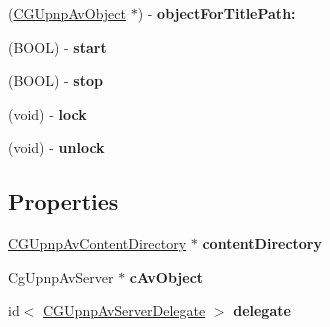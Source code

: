 \begin{DoxyCompactItemize}
\item 
\hypertarget{interface_c_g_upnp_av_server_a2242e54ebbd1783da67b6a1f39f46377}{(\hyperlink{interface_c_g_upnp_av_object}{C\-G\-Upnp\-Av\-Object} $\ast$) -\/ {\bfseries object\-For\-Title\-Path\-:}}\label{interface_c_g_upnp_av_server_a2242e54ebbd1783da67b6a1f39f46377}

\item 
\hypertarget{interface_c_g_upnp_av_server_ad04c7434fc75b76c40f943d7a03c3927}{(B\-O\-O\-L) -\/ {\bfseries start}}\label{interface_c_g_upnp_av_server_ad04c7434fc75b76c40f943d7a03c3927}

\item 
\hypertarget{interface_c_g_upnp_av_server_a5aea637778ecfec92a16c435e430e401}{(B\-O\-O\-L) -\/ {\bfseries stop}}\label{interface_c_g_upnp_av_server_a5aea637778ecfec92a16c435e430e401}

\item 
\hypertarget{interface_c_g_upnp_av_server_a7d462910c3d72f7cba44d2d8e1ba8409}{(void) -\/ {\bfseries lock}}\label{interface_c_g_upnp_av_server_a7d462910c3d72f7cba44d2d8e1ba8409}

\item 
\hypertarget{interface_c_g_upnp_av_server_a1982ae8c35c3a87525807f97f32f5c62}{(void) -\/ {\bfseries unlock}}\label{interface_c_g_upnp_av_server_a1982ae8c35c3a87525807f97f32f5c62}

\end{DoxyCompactItemize}
\subsection*{Properties}
\begin{DoxyCompactItemize}
\item 
\hypertarget{interface_c_g_upnp_av_server_aebfa94b783737e8c4f9ecfd539d1c68c}{\hyperlink{interface_c_g_upnp_av_content_directory}{C\-G\-Upnp\-Av\-Content\-Directory} $\ast$ {\bfseries content\-Directory}}\label{interface_c_g_upnp_av_server_aebfa94b783737e8c4f9ecfd539d1c68c}

\item 
\hypertarget{interface_c_g_upnp_av_server_aeef3434dabe516868ada6fb63d63d129}{Cg\-Upnp\-Av\-Server $\ast$ {\bfseries c\-Av\-Object}}\label{interface_c_g_upnp_av_server_aeef3434dabe516868ada6fb63d63d129}

\item 
\hypertarget{interface_c_g_upnp_av_server_ad52c3c42a21c2cc46c4fd32882c7fe71}{id$<$ \hyperlink{protocol_c_g_upnp_av_server_delegate-p}{C\-G\-Upnp\-Av\-Server\-Delegate} $>$ {\bfseries delegate}}\label{interface_c_g_upnp_av_server_ad52c3c42a21c2cc46c4fd32882c7fe71}

\end{DoxyCompactItemize}



